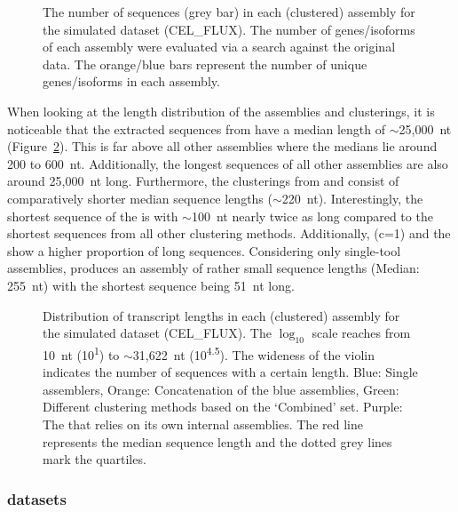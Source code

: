 \documentclass[12pt,a4paper,english]{article}
\begin{document}
	\begin{figure}[H]
		\centering
		\def\svgwidth{\textwidth}
		
		\caption[The number of sequences in each (clustered) assembly (PE, CEL\_FLUX).]{The number of sequences (grey bar) in each (clustered) assembly for the simulated \celegans dataset (CEL\_FLUX). The number of genes/isoforms of each assembly were evaluated via a \blast search against the original data. The orange/blue bars represent the number of unique genes/isoforms in each assembly.}
		\label{img:barchart_flux}
	\end{figure}
		\newpage
		When looking at the length distribution of the assemblies and clusterings, it is noticeable that the extracted sequences from \grouper have a median length of $\sim$25,000~nt (Figure~\ref{img:violin_flux}). This is far above all other assemblies where the medians lie around 200 to 600~nt. 
		Additionally, the longest sequences of all other assemblies are also around 25,000~nt long.
		Furthermore, the clusterings from \karma and \mclusttwo consist of comparatively shorter median sequence lengths ($\sim$220~nt).
		Interestingly, the shortest sequence of the \orp is with $\sim$100~nt nearly twice as long compared to the shortest sequences from all other clustering methods.
		Additionally, \cdhit (c=1) and the \orp show a higher proportion of long sequences.
		Considering only single-tool assemblies, \soap produces an assembly of rather small sequence lengths (Median: 255~nt) with the shortest sequence being 51~nt long. 

	\begin{figure}[H]
		\centering
		\def\svgwidth{\textwidth}
		
		\caption[Distribution of transcript lengths per assembly (PE, CEL\_FLUX)]{Distribution of transcript lengths in each (clustered) assembly for the simulated \celegans dataset (CEL\_FLUX). The $\log_{10}$ scale reaches from 10~nt (10\textsuperscript{1}) to $\sim$31,622~nt (10\textsuperscript{4.5}). The wideness of the violin indicates the number of sequences with a certain length. Blue: Single assemblers, Orange: Concatenation of the blue assemblies, Green: Different clustering methods based on the `Combined' set. Purple: The \orp that relies on its own internal assemblies. The red line represents the median sequence length and the dotted grey lines mark the quartiles.}
		\label{img:violin_flux}
	\end{figure}

\subsubsection*{\celegans datasets}
\end{document}
